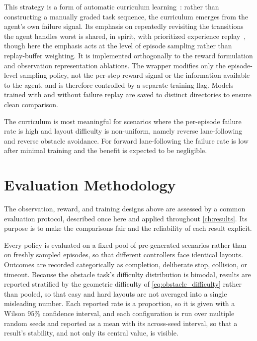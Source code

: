 This strategy is a form of automatic curriculum learning~\cite{bengio2009curriculum}: rather than constructing a manually graded task sequence, the curriculum emerges from the agent's own failure signal. Its emphasis on repeatedly revisiting the transitions the agent handles worst is shared, in spirit, with prioritized experience replay~\cite{schaul2016per}, though here the emphasis acts at the level of episode sampling rather than replay-buffer weighting. It is implemented orthogonally to the reward formulation and observation representation ablations. The wrapper modifies only the episode-level sampling policy, not the per-step reward signal or the information available to the agent, and is therefore controlled by a separate training flag. Models trained with and without failure replay are saved to distinct directories to ensure clean comparison.

The curriculum is most meaningful for scenarios where the per-episode failure rate is high and layout difficulty is non-uniform, namely reverse lane-following and reverse obstacle avoidance. For forward lane-following the failure rate is low after minimal training and the benefit is expected to be negligible.

\section{Evaluation Methodology}
\label{sec:eval_methodology}

The observation, reward, and training designs above are assessed by a common evaluation protocol, described once here and applied throughout \cref{ch:results}. Its purpose is to make the comparisons fair and the reliability of each result explicit.

Every policy is evaluated on a fixed pool of pre-generated scenarios rather than on freshly sampled episodes, so that different controllers face identical layouts. Outcomes are recorded categorically as completion, deliberate stop, collision, or timeout. Because the obstacle task's difficulty distribution is bimodal, results are reported stratified by the geometric difficulty of \cref{eq:obstacle_difficulty} rather than pooled, so that easy and hard layouts are not averaged into a single misleading number. Each reported rate is a proportion, so it is given with a Wilson $95\%$ confidence interval, and each configuration is run over multiple random seeds and reported as a mean with its across-seed interval, so that a result's stability, and not only its central value, is visible.

